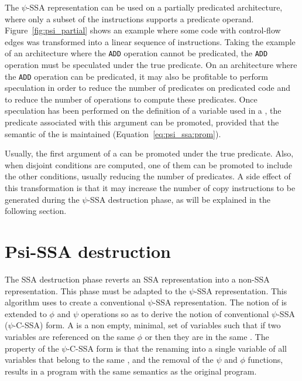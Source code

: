 The $\psi$-SSA representation can be used on a
  partially predicated architecture, where only a subset of the
  instructions supports a predicate operand.
  Figure~\ref{fig:psi_partial} shows an example where some code with
  control-flow edges was transformed into a linear sequence of
  instructions.
%
Taking the example of an architecture where the \texttt{ADD} operation
cannot be predicated, the \texttt{ADD} operation must be speculated
under the {true} predicate. 
%
On an architecture where the \texttt{ADD} operation can be predicated, it
may also be profitable to perform speculation in order to reduce the
number of predicates on predicated code and to reduce the number of
operations to compute these predicates. 
%
Once speculation has been performed on the definition of a variable
used in a \psifun, the predicate associated with this argument
can be promoted, provided that the semantic of the \psifun is maintained (Equation~\ref{eq:psi_ssa:prom}). 



Usually, the first argument of a \psifun can be promoted
under the {true} predicate. Also, when disjoint conditions are
computed, one of them can be promoted to include the other conditions,
usually reducing the number of predicates. A side effect of this
transformation is that it may increase the number of copy instructions
to be generated during the $\psi$-SSA destruction phase,
as will be explained in the following section.


\section{Psi-SSA destruction}
\label{sec:Psi_ssa_destruction}



The SSA destruction phase reverts an SSA representation into a non-SSA
representation. This phase must be adapted to the $\psi$-SSA
representation. This algorithm uses
\phipsiwebs to create a conventional $\psi$-SSA
representation. The notion of \phiwebs is
extended to $\phi$ and $\psi$ operations so as to derive the notion of
conventional $\psi$-SSA ($\psi$-C-SSA) form. A \phipsiweb is
a non empty, minimal, set of variables such that if two variables are
referenced on the same $\phi$ or \psifun then they are in the
same \phipsiweb. The property of the $\psi$-C-SSA form is that the
renaming into a single variable of all variables that belong to the
same \phipsiweb, and the removal of the $\psi$ and $\phi$
functions, results in a program with the same semantics as the
original program.

